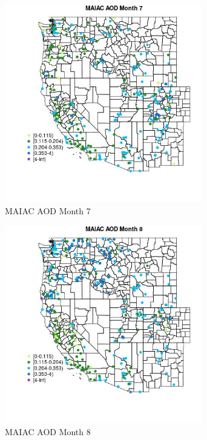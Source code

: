 \begin{figure} 
\centering  
\includegraphics[width=0.77\textwidth]{Code_Outputs/Report_ML_input_PM25_Step4_part_e_de_duplicated_aveswNAs_MapObsMo7MAIAC_AOD.jpg} 
\caption{\label{fig:Report_ML_input_PM25_Step4_part_e_de_duplicated_aveswNAsMapObsMo7MAIAC_AOD}MAIAC AOD Month 7} 
\end{figure} 
 

\begin{figure} 
\centering  
\includegraphics[width=0.77\textwidth]{Code_Outputs/Report_ML_input_PM25_Step4_part_e_de_duplicated_aveswNAs_MapObsMo8MAIAC_AOD.jpg} 
\caption{\label{fig:Report_ML_input_PM25_Step4_part_e_de_duplicated_aveswNAsMapObsMo8MAIAC_AOD}MAIAC AOD Month 8} 
\end{figure} 
 

